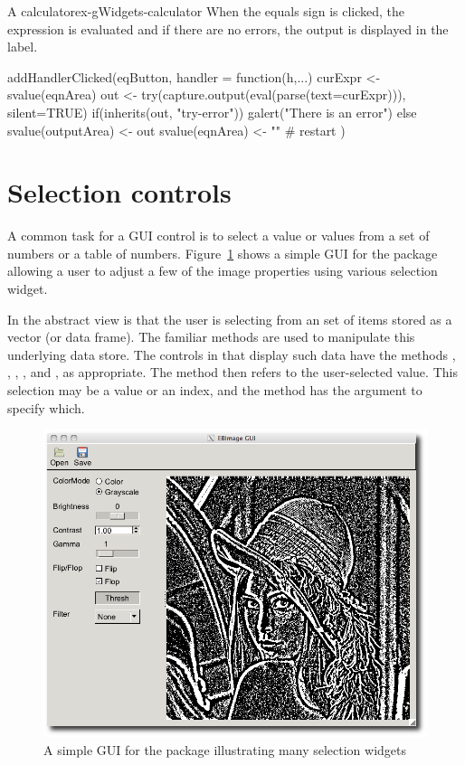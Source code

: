 \begin{example}{A calculator}{ex-gWidgets-calculator}
When the equals sign is clicked, the expression is evaluated and if
there are no errors, the output is displayed in the label.
\begin{Schunk}
\begin{Sinput}
 addHandlerClicked(eqButton, handler = function(h,...) {
   curExpr <- svalue(eqnArea)
   out <- try(capture.output(eval(parse(text=curExpr))), 
              silent=TRUE)
   if(inherits(out, "try-error")) {
     galert("There is an error")
   } else {
     svalue(outputArea) <- out
     svalue(eqnArea) <- ""            # restart
   }
 })
\end{Sinput}
\end{Schunk}

\end{example}

\section{Selection controls}
\label{sec:gWidgets-widg-select-data}

A common task for a GUI control is to select a value or values from a
set of numbers or a table of
numbers. Figure~\ref{fig:gWidgets-EBImage-gui} shows a simple GUI for
the  package allowing a user to adjust a few of the image
properties using various selection widget.

In  the abstract view is that the user is selecting from
an set of items stored as a vector (or data frame). The familiar \R\/
methods are used to manipulate this underlying data store. The
controls in  that display such data have the methods
\code{[}, \code{[\ASSIGN}, , ,  and
, as appropriate. The  method then
refers to the user-selected value. This selection may be a value or an
index, and the  method has the argument  to
specify which.

\begin{figure}
  \centering
  \includegraphics[width=.75\textwidth]{fig-gWidgets-EBImage-gui}
  \caption{A simple GUI for the  package illustrating many selection widgets}
  \label{fig:gWidgets-EBImage-gui}
\end{figure}


